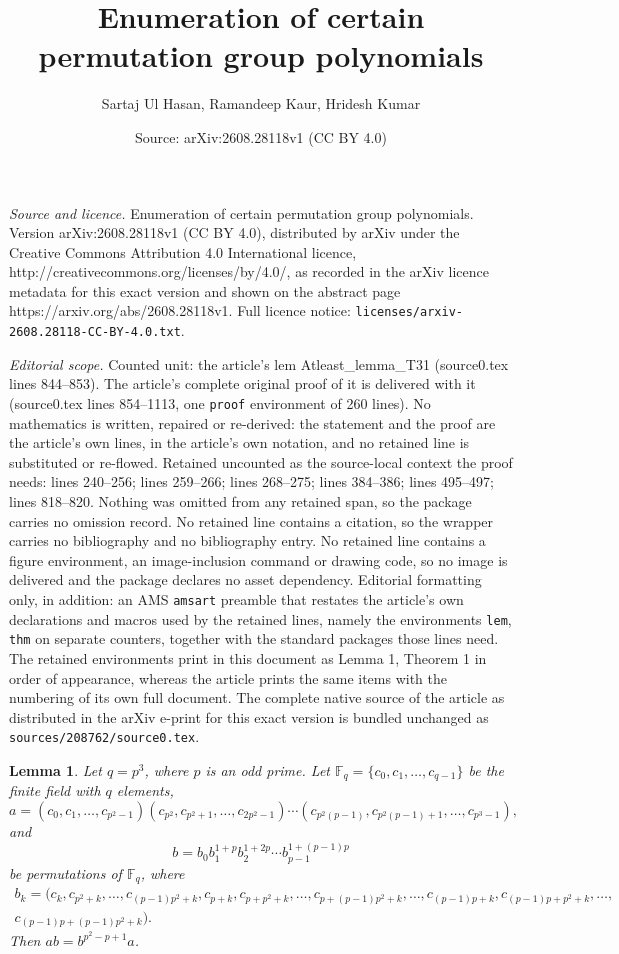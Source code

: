 \documentclass[10pt,a4paper]{amsart}
\title{Enumeration of certain permutation group polynomials}
\author{Sartaj Ul Hasan, Ramandeep Kaur, Hridesh Kumar}
\date{Source: arXiv:2608.28118v1 (CC BY 4.0)}
\newtheorem{lem}{Lemma}
\def\F{{\mathbb F}}
\begin{document}
\maketitle

\noindent\emph{Source and licence.} Enumeration of certain permutation group polynomials. Version arXiv:2608.28118v1 (CC BY 4.0), distributed by arXiv under the Creative Commons Attribution 4.0 International licence, http://creativecommons.org/licenses/by/4.0/, as recorded in the arXiv licence metadata for this exact version and shown on the abstract page https://arxiv.org/abs/2608.28118v1. Full licence notice: \texttt{licenses/arxiv-2608.28118-CC-BY-4.0.txt}.\par\smallskip

\noindent\textit{Editorial scope.} Counted unit: the article's lem Atleast\_lemma\_T31 (source0.tex lines 844--853). The article's complete original proof of it is delivered with it (source0.tex lines 854--1113, one \texttt{proof} environment of 260 lines). No mathematics is written, repaired or re-derived: the statement and the proof are the article's own lines, in the article's own notation, and no retained line is substituted or re-flowed.  Retained uncounted as the source-local context the proof needs: lines 240--256; lines 259--266; lines 268--275; lines 384--386; lines 495--497; lines 818--820.  Nothing was omitted from any retained span, so the package carries no omission record.  No retained line contains a citation, so the wrapper carries no bibliography and no bibliography entry.  No retained line contains a figure environment, an image-inclusion command or drawing code, so no image is delivered and the package declares no asset dependency.  Editorial formatting only, in addition: an AMS \texttt{amsart} preamble that restates the article's own declarations and macros used by the retained lines, namely the environments \texttt{lem}, \texttt{thm} on separate counters, together with the standard packages those lines need.  The retained environments print in this document as Lemma 1, Theorem 1 in order of appearance, whereas the article prints the same items with the numbering of its own full document.  The complete native source of the article as distributed in the arXiv e-print for this exact version is bundled unchanged as \texttt{sources/208762/source0.tex}.
 \begin{lem}\label{RR1}
 Let $q=p^3$, where $p$ is an odd prime. Let $\F_q = \{ c_0, c_1, \ldots, c_{q-1}\}$ be the finite field with $q$ elements,
\[
a=(c_{0},c_{1},\ldots,c_{p^2-1})(c_{p^2},c_{p^2+1},\ldots,c_{2p^2-1})\cdots (c_{p^2(p-1)},c_{p^2(p-1)+1},\ldots,c_{p^3-1}), 
\]
 and 
\[
b=b_{0}b_{1}^{1+p}b_2^{1+2p}\cdots b_{p-1}^{1+(p-1)p}
\]
be permutations of $\F_q$, where 
\begin{equation*}
\begin{split}
b_{k}=(c_{k},c_{p^2+k},\ldots,c_{(p-1)p^2+k},c_{p+k},c_{p+p^2+k},\ldots,c_{p+(p-1)p^2+k},\ldots,c_{(p-1)p+k},c_{(p-1)p+p^2+k},\ldots,& \\ c_{(p-1)p+(p-1)p^2+k}). 
\end{split}
\end{equation*}
Then $ab=b^{p^2-p+1}a$.
 \end{lem}
\end{document}
